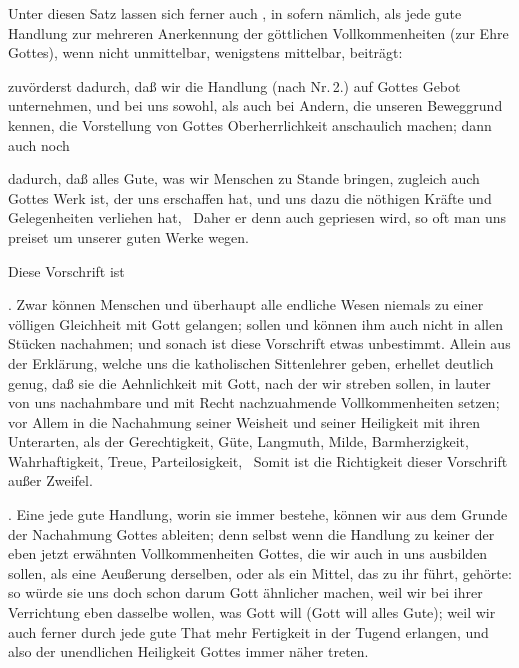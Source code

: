 \begin{aufza}
\begin{aufzb}
\item Unter diesen Satz lassen sich ferner auch , in sofern nämlich, als jede gute Handlung zur mehreren Anerkennung der göttlichen Vollkommenheiten (zur Ehre Gottes), wenn nicht unmittelbar, wenigstens mittelbar, beiträgt:
\begin{aufzc}
\item zuvörderst dadurch, daß wir die Handlung (nach Nr.\,2.) auf Gottes Gebot unternehmen, und bei uns sowohl, als auch bei Andern, die unseren Beweggrund kennen, die Vorstellung von Gottes Oberherrlichkeit anschaulich machen; dann auch noch~
\item dadurch, daß alles Gute, was wir Menschen zu Stande bringen, zugleich auch Gottes Werk ist, der uns erschaffen hat, und uns dazu die nöthigen Kräfte und Gelegenheiten verliehen hat, \usw\ Daher er denn auch gepriesen wird, so oft man uns preiset um unserer guten Werke wegen.
\end{aufzc}
\end{aufzb}
\item {}\par
Diese Vorschrift ist
\begin{aufzb}
\item {}. Zwar können Menschen und überhaupt alle endliche Wesen niemals zu einer völligen Gleichheit mit Gott gelangen; sollen und können ihm auch nicht in allen Stücken nachahmen; und sonach ist diese Vorschrift etwas unbestimmt. Allein aus der Erklärung, welche uns die katholischen Sittenlehrer geben, erhellet deutlich genug, daß sie die Aehnlichkeit mit Gott, nach der wir streben sollen, in lauter von uns nachahmbare und mit Recht nachzuahmende Vollkommenheiten setzen; vor Allem in die Nachahmung seiner Weisheit und seiner Heiligkeit mit ihren Unterarten, als der Gerechtigkeit, Güte, Langmuth, Milde, Barmherzigkeit, Wahrhaftigkeit, Treue, Parteilosigkeit, \usw\ Somit ist die Richtigkeit dieser Vorschrift außer Zweifel.
\item {}. Eine jede gute Handlung, worin sie immer bestehe, können wir aus dem Grunde der Nachahmung Gottes ableiten; denn selbst wenn die Handlung zu keiner der eben jetzt erwähnten Vollkommenheiten Gottes, die wir auch in uns ausbilden sollen, als eine Aeußerung derselben, oder als ein Mittel, das zu ihr führt, gehörte: so würde sie uns doch schon darum Gott ähnlicher machen, weil wir bei ihrer Verrichtung eben dasselbe wollen, was Gott will (Gott will alles Gute); weil wir auch ferner durch jede gute That mehr Fertigkeit in der Tugend erlangen, und also der unendlichen Heiligkeit Gottes immer näher treten.

\end{aufzb}
\end{aufza}

